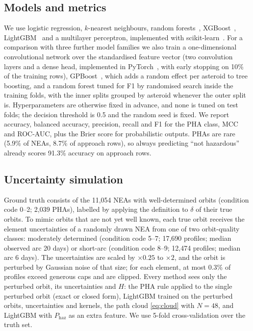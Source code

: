 \documentclass[conference]{IEEEtran}
\begin{document}
\subsection{Models and metrics}
We use logistic regression, $k$-nearest neighbours, random forests~\cite{breiman2001}, XGBoost~\cite{chen2016}, LightGBM~\cite{ke2017} and a multilayer perceptron, implemented with scikit-learn~\cite{pedregosa2011}. For a comparison with three further model families we also train a one-dimensional convolutional network over the standardised feature vector (two convolution layers and a dense head, implemented in PyTorch~\cite{paszke2019}, with early stopping on 10\% of the training rows), GPBoost~\cite{sigrist2022}, which adds a random effect per asteroid to tree boosting, and a random forest tuned for F1 by randomised search inside the training folds, with the inner splits grouped by asteroid whenever the outer split is. Hyperparameters are otherwise fixed in advance, and none is tuned on test folds; the decision threshold is 0.5 and the random seed is fixed. We report accuracy, balanced accuracy, precision, recall and F1 for the PHA class, MCC~\cite{chicco2020} and ROC-AUC, plus the Brier score for probabilistic outputs. PHAs are rare (5.9\% of NEAs, 8.7\% of approach rows), so always predicting ``not hazardous'' already scores 91.3\% accuracy on approach rows.

\subsection{Uncertainty simulation}
Ground truth consists of the 11,054 NEAs with well-determined orbits (condition code 0--2; 2,039 PHAs), labelled by applying the definition to $\delta$ of their true orbits. To mimic orbits that are not yet well known, each true orbit receives the element uncertainties of a randomly drawn NEA from one of two orbit-quality classes: moderately determined (condition code 5--7; 17,690 profiles; median observed arc 20 days) or short-arc (condition code 8--9; 12,474 profiles; median arc 6 days). The uncertainties are scaled by $\times0.25$ to $\times2$, and the orbit is perturbed by Gaussian noise of that size; for each element, at most 0.3\% of profiles exceed generous caps and are clipped. Every method sees only the perturbed orbit, its uncertainties and $H$: the PHA rule applied to the single perturbed orbit (exact or closed form), LightGBM trained on the perturbed orbits, uncertainties and kernels, the path cloud \eqref{eq:cloud} with $N = 48$, and LightGBM with $P_{\mathrm{haz}}$ as an extra feature. We use 5-fold cross-validation over the truth set.
\end{document}
